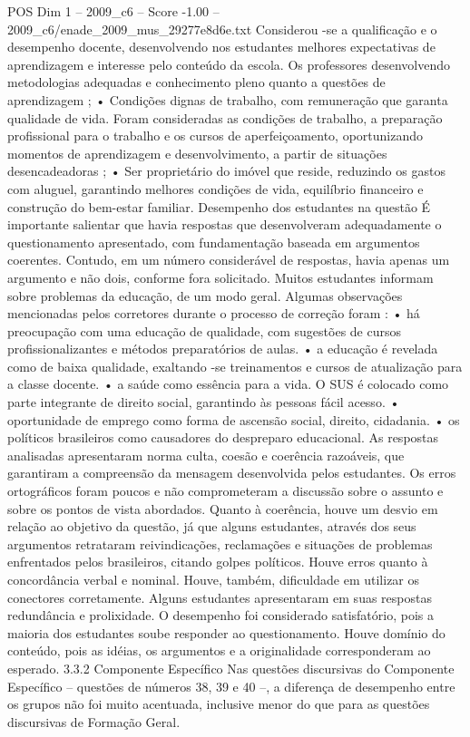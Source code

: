 \begin{textsample}{POS Dim 1 – 2009\_c6 – Score -1.00 – 2009\_c6/enade\_2009\_mus\_29277e8d6e.txt}
Considerou -se a qualificação e o desempenho docente, desenvolvendo nos estudantes melhores expectativas de aprendizagem e interesse pelo conteúdo da escola.
Os professores desenvolvendo metodologias adequadas e conhecimento pleno quanto a questões de aprendizagem ; • Condições dignas de trabalho, com remuneração que garanta qualidade de vida.
Foram consideradas as condições de trabalho, a preparação profissional para o trabalho e os cursos de aperfeiçoamento, oportunizando momentos de aprendizagem e desenvolvimento, a partir de situações desencadeadoras ; • Ser proprietário do imóvel que reside, reduzindo os gastos com aluguel, garantindo melhores condições de vida, equilíbrio financeiro e construção do bem-estar familiar.
Desempenho dos estudantes na questão É importante salientar que havia respostas que desenvolveram adequadamente o questionamento apresentado, com fundamentação baseada em argumentos coerentes.
Contudo, em um número considerável de respostas, havia apenas um argumento e não dois, conforme fora solicitado.
Muitos estudantes informam sobre problemas da educação, de um modo geral.
Algumas observações mencionadas pelos corretores durante o processo de correção foram : • há preocupação com uma educação de qualidade, com sugestões de cursos profissionalizantes e métodos preparatórios de aulas. • a educação é revelada como de baixa qualidade, exaltando -se treinamentos e cursos de atualização para a classe docente. • a saúde como essência para a vida.
O SUS é colocado como parte integrante de direito social, garantindo às pessoas fácil acesso. • oportunidade de emprego como forma de ascensão social, direito, cidadania. • os políticos brasileiros como causadores do despreparo educacional.
As respostas analisadas apresentaram norma culta, coesão e coerência razoáveis, que garantiram a compreensão da mensagem desenvolvida pelos estudantes.
Os erros ortográficos foram poucos e não comprometeram a discussão sobre o assunto e sobre os pontos de vista abordados.
Quanto à coerência, houve um desvio em relação ao objetivo da questão, já que alguns estudantes, através dos seus argumentos retrataram reivindicações, reclamações e situações de problemas enfrentados pelos brasileiros, citando golpes políticos.
Houve erros quanto à concordância verbal e nominal.
Houve, também, dificuldade em utilizar os conectores corretamente.
Alguns estudantes apresentaram em suas respostas redundância e prolixidade.
O desempenho foi considerado satisfatório, pois a maioria dos estudantes soube responder ao questionamento.
Houve domínio do conteúdo, pois as idéias, os argumentos e a originalidade corresponderam ao esperado. 3.3.2 Componente Específico Nas questões discursivas do Componente Específico – questões de números 38, 39 e 40 –, a diferença de desempenho entre os grupos não foi muito acentuada, inclusive menor do que para as questões discursivas de Formação Geral.

\end{textsample}
